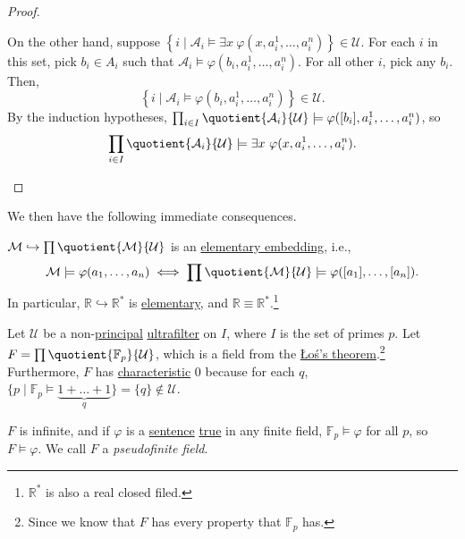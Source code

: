 \begin{proof}
\begin{itemize}
		      On the other hand, suppose \(\left\{ i \mid \mathcal{A} _i \models \exists x\ \varphi (x, a_i^1, \dots , a_i^n) \right\} \in \mathcal{U} \). For each \(i\) in this set, pick \(b_i\in A_i\) such that \(\mathcal{A} _i \models \varphi (b_i, a_i^1, \dots , a_i^n)\). For all other \(i\), pick any \(b_i\). Then,
		      \[
			      \left\{ i \mid \mathcal{A} _i \models \varphi (b_i, a_i^1, \dots , a_i^n) \right\} \in \mathcal{U}.
		      \]
		      By the induction hypotheses, \(\prod_{i\in I} \quotient{\mathcal{A}_i }{\mathcal{U} } \models \varphi ([b_i], a_i^1, \dots , a_i^n)\), so
		      \[
			      \prod_{i\in I} \quotient{\mathcal{A}_i }{\mathcal{U} } \models \exists x\ \varphi (x, a_i^1, \dots , a_i^n).
		      \]
	\end{itemize}
\end{proof}

We then have the following immediate consequences.

\begin{note}
	\(\mathcal{M} \hookrightarrow \prod \quotient{\mathcal{M} }{\mathcal{U} } \) is an \hyperref[def:elementary-embedding]{elementary embedding}, i.e.,
	\[
		\mathcal{M} \models \varphi (a_1, \dots , a_n) \iff \prod \quotient{\mathcal{M} }{\mathcal{U} } \models \varphi ([a_1], \dots , [a_n]).
	\]
	In particular, \(\mathbb{R} \hookrightarrow \mathbb{R} ^{\ast} \) is \hyperref[def:elementary-embedding]{elementary}, and \(\mathbb{R} \equiv \mathbb{R} ^{\ast} \).\footnote{\(\mathbb{R} ^{\ast} \) is also a real closed filed.}
\end{note}

\begin{eg}
	Let \(\mathcal{U} \) be a non-\hyperref[eg:principal-filter]{principal} \hyperref[def:ultrafilter]{ultrafilter} on \(I\), where \(I\) is the set of primes \(p\). Let \(F = \prod \quotient{\mathbb{F} _p}{\mathcal{U} } \), which is a field from the \hyperref[thm:Los]{Łoś's theorem}.\footnote{Since we know that \(F\) has every property that \(\mathbb{F} _p\) has.} Furthermore, \(F\) has \hyperref[def:characteristic]{characteristic} \(0\) because for each \(q\), \(\{ p \mid \mathbb{F} _p \models \underbrace{1 + \dots + 1}_{q} \} = \{ q \} \notin \mathcal{U} \).

	\(F\) is infinite, and if \(\varphi \) is a \hyperref[def:sentence]{sentence} \hyperref[def:truth]{true} in any finite field, \(\mathbb{F} _p \models \varphi \) for all \(p\), so \(F \models \varphi \). We call \(F\) a \emph{pseudofinite field}.
\end{eg}

